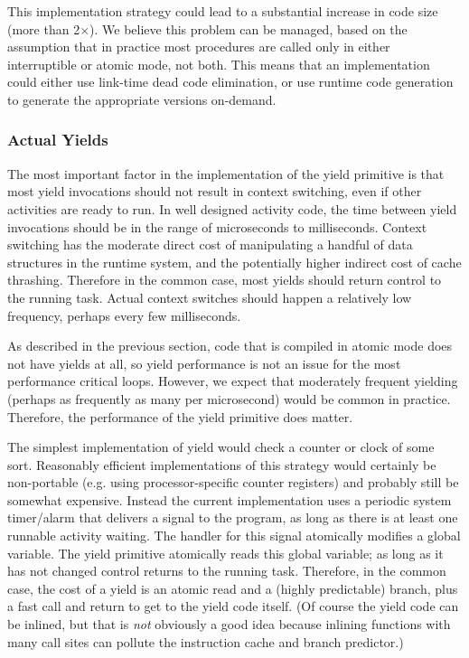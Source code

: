 \documentclass[acmsmall,anonymous,review]{acmart}\settopmatter{printfolios=true,printccs=false,printacmref=false}
\begin{document}
This implementation strategy could lead to a substantial increase in code size (more than 2$\times$).
We believe this problem can be managed, based on the assumption that in practice most procedures are called only in either interruptible or atomic mode, not both.
This means that an implementation could either use link-time dead code elimination, or use runtime code generation to generate the appropriate versions on-demand.

\subsubsection{Actual Yields}

The most important factor in the implementation of the yield primitive is that most yield invocations should not result in context switching, even if other activities are ready to run.
In well designed activity code, the time between yield invocations should be in the range of microseconds to milliseconds.
Context switching has the moderate direct cost of manipulating a handful of data structures in the runtime system, and the potentially higher indirect cost of cache thrashing.
Therefore in the common case, most yields should return control to the running task.
Actual context switches should happen a relatively low frequency, perhaps every few milliseconds.

As described in the previous section, code that is compiled in atomic mode does not have yields at all, so yield performance is not an issue for the most performance critical loops.
However, we expect that moderately frequent yielding (perhaps as frequently as many per microsecond) would be common in practice.
Therefore, the performance of the yield primitive does matter.

The simplest implementation of yield would check a counter or clock of some sort.
Reasonably efficient implementations of this strategy would certainly be non-portable (e.g. using processor-specific counter registers) and probably still be somewhat expensive.
Instead the current \charcoal{} implementation uses a periodic system timer/alarm that delivers a signal to the program, as long as there is at least one runnable activity waiting.
The handler for this signal atomically modifies a global variable.
The yield primitive atomically reads this global variable; as long as it has not changed control returns to the running task.
Therefore, in the common case, the cost of a yield is an atomic read and a (highly predictable) branch, plus a fast call and return to get to the yield code itself.
(Of course the yield code can be inlined, but that is \emph{not} obviously a good idea because inlining functions with many call sites can pollute the instruction cache and branch predictor.)
\end{document}
